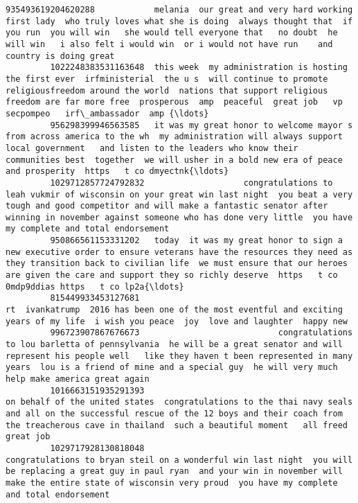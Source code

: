 \documentclass[11pt]{article}
\begin{document}
\begin{Verbatim}[commandchars=\\\{\}]
         935493619204620288            melania  our great and very hard working first lady  who truly loves what she is doing  always thought that  if you run  you will win   she would tell everyone that   no doubt  he will win   i also felt i would win  or i would not have run    and country is doing great    
         1022248383531163648  this week  my administration is hosting the first ever  irfministerial  the u s  will continue to promote  religiousfreedom around the world  nations that support religious freedom are far more free  prosperous  amp  peaceful  great job   vp   secpompeo   irf\_ambassador  amp {\ldots}   
         956298399946563585   it was my great honor to welcome mayor s from across america to the wh  my administration will always support local government   and listen to the leaders who know their communities best  together  we will usher in a bold new era of peace and prosperity  https   t co dmyectnk{\ldots}   
         1029712857724792832                    congratulations to leah vukmir of wisconsin on your great win last night  you beat a very tough and good competitor and will make a fantastic senator after winning in november against someone who has done very little  you have my complete and total endorsement    
         950866561153331202   today  it was my great honor to sign a new executive order to ensure veterans have the resources they need as they transition back to civilian life  we must ensure that our heroes are given the care and support they so richly deserve  https   t co 0mdp9ddias https   t co lp2a{\ldots}   
         815449933453127681                                                                                                                                               rt  ivankatrump  2016 has been one of the most eventful and exciting years of my life  i wish you peace  joy  love and laughter  happy new    
         996723907867676673                            congratulations to lou barletta of pennsylvania  he will be a great senator and will represent his people well   like they haven t been represented in many years  lou is a friend of mine and a special guy  he will very much help make america great again    
         1016663151935291393                                                            on behalf of the united states  congratulations to the thai navy seals and all on the successful rescue of the 12 boys and their coach from the treacherous cave in thailand  such a beautiful moment   all freed  great job    
         1029717928130818048                                                   congratulations to bryan steil on a wonderful win last night  you will be replacing a great guy in paul ryan  and your win in november will make the entire state of wisconsin very proud  you have my complete and total endorsement    

\end{Verbatim}
\end{document}
